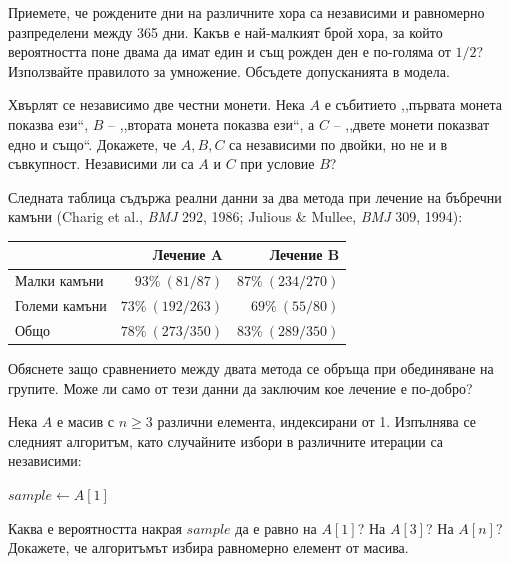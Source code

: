 \documentclass[11pt,a4paper]{article}
\newcounter{problem}[section]
\begin{document}
\begin{probleminteresting}
Приемете, че рождените дни на различните хора са независими и равномерно
разпределени между 365 дни. Какъв е най-малкият брой хора, за който
вероятността поне двама да имат един и същ рожден ден е по-голяма от $1/2$?
Използвайте правилото за умножение. Обсъдете допусканията в модела.
\end{probleminteresting}

\begin{problem}
Хвърлят се независимо две честни монети. Нека $A$ е събитието
,,първата монета показва ези``, $B$ -- ,,втората монета показва ези``,
а $C$ -- ,,двете монети показват едно и също``.
Докажете, че $A,B,C$ са независими по двойки, но не и в съвкупност.
Независими ли са $A$ и $C$ при условие $B$?
\end{problem}

\begin{probleminteresting}
Следната таблица съдържа реални данни за два метода при лечение на бъбречни
камъни (Charig et al., \emph{BMJ} 292, 1986; Julious \& Mullee, \emph{BMJ} 309, 1994):
\begin{center}
\small
\begin{tabular}{@{}lrr@{}}
\toprule
 & Лечение A & Лечение B \\
\midrule
Малки камъни & $93\%\ (81/87)$ & $87\%\ (234/270)$ \\
Големи камъни & $73\%\ (192/263)$ & $69\%\ (55/80)$ \\
Общо & $78\%\ (273/350)$ & $83\%\ (289/350)$ \\
\bottomrule
\end{tabular}
\end{center}
Обяснете защо сравнението между двата метода се обръща при обединяване
на групите. Може ли само от тези данни да заключим кое лечение е по-добро?
\end{probleminteresting}

\begin{probleminteresting}
Нека $A$ е масив с $n\ge3$ различни елемента, индексирани от 1.
Изпълнява се следният алгоритъм, като случайните избори в различните
итерации са независими:

\begin{algorithm}[H]
\caption{Reservoir sampling за един елемент}
$sample \gets A[1]$\;
\end{algorithm}

Каква е вероятността накрая $sample$ да е равно на $A[1]$? На $A[3]$?
На $A[n]$? Докажете, че алгоритъмът избира равномерно елемент от масива.
\end{probleminteresting}
\end{document}

